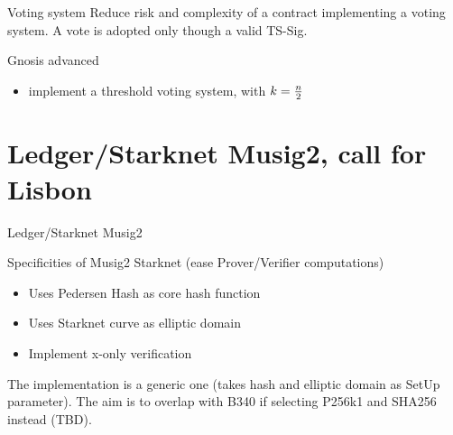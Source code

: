\documentclass[aspectratio=43]{beamer}
\begin{document}
\begin{frame}{Voting system}
Reduce risk and complexity of a contract implementing a voting system.
A vote is adopted only though a valid TS-Sig.

\begin{exampleblock}{Gnosis advanced}
\begin{itemize}
\item implement a threshold voting system, with $k={n\over 2}$
\end{itemize}
\end{exampleblock}


\end{frame} 

\section{Ledger/Starknet Musig2, call for Lisbon}



\begin{frame}{Ledger/Starknet Musig2}

Specificities of Musig2 Starknet (ease Prover/Verifier computations)
\begin{itemize}
\item Uses Pedersen Hash as core hash function 
\item Uses Starknet curve as elliptic domain
\item Implement x-only verification
\end{itemize} 
The implementation is a generic one (takes hash and elliptic domain as SetUp parameter).
The aim is to overlap with B340 if selecting P256k1 and SHA256 instead (TBD).     
     
\end{frame}
\end{document}
